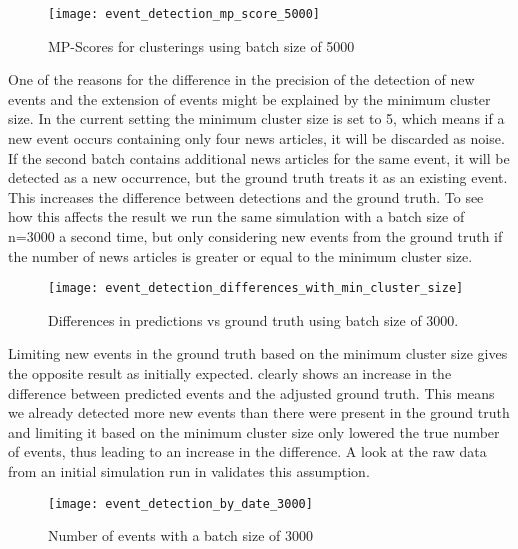 \begin{figure}[h]
    \centering
    \texttt{[image: event\_detection\_mp\_score\_5000]}
    \caption{MP-Scores for clusterings using batch size of 5000}
    \label{fig:event_detection_mp_score_5000}
\end{figure}

One of the reasons for the difference in the precision of the detection of new events and the extension of events
might be explained by the minimum cluster size.
In the current setting the minimum cluster size is set to 5,
which means if a new event occurs containing only four news articles,
it will be discarded as noise.
If the second batch contains additional news articles for the same event,
it will be detected as a new occurrence, but the ground truth treats it as an existing event. 
This increases the difference between detections and the ground truth.
To see how this affects the result we run the same simulation with a batch size of n=3000 a second time,
but only considering new events from the ground truth
if the number of news articles is greater or equal to the minimum cluster size.

\begin{figure}[h]
    \centering
    \texttt{[image: event\_detection\_differences\_with\_min\_cluster\_size]}
    \caption{Differences in predictions vs ground truth using batch size of 3000.}
    \label{fig:event_detection_differences_with_min_cluster_size}
\end{figure}

Limiting new events in the ground truth based on the minimum cluster size
gives the opposite result as initially expected.
 clearly shows
an increase in the difference between predicted events and the adjusted ground truth.
This means we already detected more new events than there were present in the ground truth
and limiting it based on the minimum cluster size only lowered the true number of events,
thus leading to an increase in the difference.
A look at the raw data from an initial simulation run in 
validates this assumption.

\begin{figure}[h]
    \centering
    \texttt{[image: event\_detection\_by\_date\_3000]}
    \caption{Number of events with a batch size of 3000}
    \label{fig:event_detection_by_date_3000}
\end{figure}

